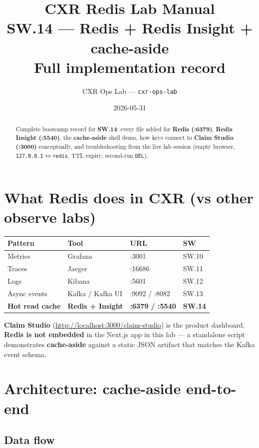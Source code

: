 \documentclass[11pt,a4paper]{report}
\title{CXR Redis Lab Manual\\
\large SW.14 --- Redis + Redis Insight + cache-aside\\
\large Full implementation record}
\author{CXR Ops Lab --- \texttt{cxr-ops-lab}}
\date{2026-05-31}
\begin{document}
\maketitle
\begin{abstract}
Complete bootcamp record for \textbf{SW.14}: every file added for \textbf{Redis (:6379)},
\textbf{Redis Insight (:5540)}, the \textbf{cache-aside} shell demo, how keys connect to
\textbf{Claim Studio (:3000)} conceptually, and troubleshooting from the live lab session
(empty browser, \texttt{127.0.0.1} vs \texttt{redis}, TTL expiry, second-run \texttt{DEL}).
\end{abstract}
\tableofcontents
\newpage

\chapter{What Redis does in CXR (vs other observe labs)}

\begin{center}
\begin{tabular}{llll}
\toprule
Pattern & Tool & URL & SW \\
\midrule
Metrics & Grafana & :3001 & SW.10 \\
Traces & Jaeger & :16686 & SW.11 \\
Logs & Kibana & :5601 & SW.12 \\
Async events & Kafka / Kafka UI & :9092 / :8082 & SW.13 \\
\textbf{Hot read cache} & \textbf{Redis + Insight} & \textbf{:6379 / :5540} & \textbf{SW.14} \\
\bottomrule
\end{tabular}
\end{center}

\noindent\textbf{Claim Studio} (\url{http://localhost:3000/claim-studio}) is the product dashboard.
\textbf{Redis is not embedded} in the Next.js app in this lab --- a standalone script demonstrates
\textbf{cache-aside} against a static JSON artifact that matches the Kafka event schema.

\chapter{Architecture: cache-aside end-to-end}

\section{Data flow}
\end{document}
